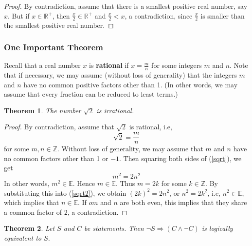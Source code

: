 \documentclass[10pt,reqno]{book}
\theoremstyle{plain}
\newtheorem{theorem}{Theorem}[section]
\def\R{\mathbb{R}}
\def\Z{\mathbb{Z}}
\def\E{\mathbb{E}}
\begin{document}
	\begin{proof}
		By contradiction, assume that there is a smallest positive real number, say $ x $. But if $ x \in \R^+ $, then $ \frac{x}{2} \in \R^+ $ and $ \frac{x}{2} < x $, a contradiction, since $ \frac{x}{2} $ is smaller than the smallest positive real number.
	\end{proof}

	\subsubsection*{One Important Theorem}
	
	Recall that a real number $ x $ is \textbf{rational} if $ x = \frac{m}{n} $ for some integers $ m $ and $ n $. Note that if necessary, we may assume (without loss of generality) that the integers $ m $ and $ n $ have no common positive factors other than 1. (In other words, we may assume that every fraction can be reduced to least terms.)
	
	\begin{theorem}
		The number $ \sqrt{2} $ is irrational.
	\end{theorem}
	
	\begin{proof}
		By contradiction, assume that $ \sqrt{2} $ is rational, i.e,
		\begin{equation}\label{sqrt}
			\sqrt{2} = \frac{m}{n}
		\end{equation}
		for some $ m,n \in \Z $. Without loss of generality, we may assume that $ m $ and $ n $ have no common factors other than 1 or $ -1 $. Then squaring both sides of (\ref{sqrt}), we get 
		\begin{equation}\label{sqrt2}
			m^2 = 2n^2
		\end{equation}
		In other words, $ m^2 \in \E $. Hence $ m \in \E $. Thus $ m = 2k $ for some $ k \in \Z $. By substituting this into (\ref{sqrt2}), we obtain $ (2k)^2 = 2n^2 $, or $ n^2 = 2k^2 $, i.e, $ n^2 \in \E $, which implies that $ n \in \E $. If $ om $ and $ n $ are both even, this implies that they share a common factor of 2, a contradiction.
	\end{proof}

	\begin{theorem}
		Let $ S $ and $ C $ be statements. Then $ \neg S \Rightarrow (C \wedge \neg C) $ is logically equivalent to $ S $.
	\end{theorem}
\end{document}
